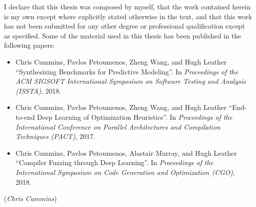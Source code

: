 I declare that this thesis was composed by myself, that the work contained herein is my own except where explicitly stated otherwise in the text, and that this work has not been submitted for any other degree or professional qualification except as specified. Some of the material used in this thesis has been published in the following papers:
\begin{itemize}
	\item Chris Cummins, Pavlos Petoumenos, Zheng Wang, and Hugh Leather ``Synthesizing Benchmarks for Predictive Modeling''. In \emph{Proceedings of the ACM SIGSOFT International Symposium on Software Testing and Analysis (ISSTA)}, 2018.
	\item Chris Cummins, Pavlos Petoumenos, Zheng Wang, and Hugh Leather ``End-to-end Deep Learning of Optimization Heuristics''. In \emph{Proceedings of the International Conference on Parallel Architectures and Compilation Techniques (PACT)}, 2017.
	\item Chris Cummins, Pavlos Petoumenos, Alastair Murray, and Hugh Leather ``Compiler Fuzzing through Deep Learning''. In \emph{Proceedings of the International Symposium on Code Generation and Optimization (CGO)}, 2018.
\end{itemize}
\vspace{1in}\raggedleft({\em Chris Cummins\/})
